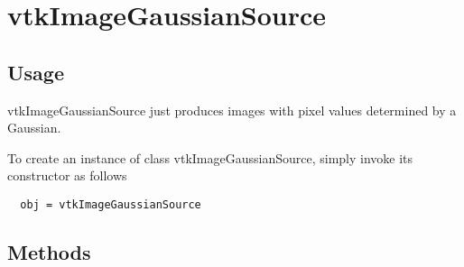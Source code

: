 \section{vtkImageGaussianSource}

\subsection{Usage}

 vtkImageGaussianSource just produces images with pixel values determined 
 by a Gaussian.

To create an instance of class vtkImageGaussianSource, simply
invoke its constructor as follows
\begin{verbatim}
  obj = vtkImageGaussianSource
\end{verbatim}
\subsection{Methods}


